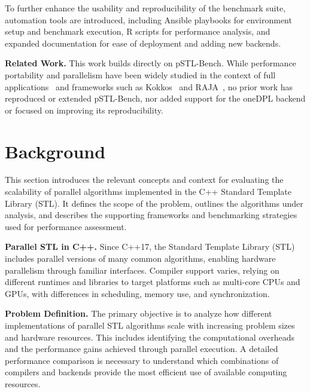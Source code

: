 \documentclass[sigconf]{acmart}
\newcommand{\mypar}[1]{{\bf #1.}}
\begin{document}
To further enhance the usability and reproducibility of the benchmark suite,
automation tools are introduced, including Ansible playbooks for environment
setup and benchmark execution, R scripts for performance analysis, and expanded
documentation for ease of deployment and adding new backends.

\mypar{Related Work} This work builds directly on pSTL-Bench.
While performance portability and parallelism have been widely studied in
the context of full applications~\cite{app} and frameworks such as Kokkos~\cite{Kokkos}
and RAJA~\cite{RAJA}, no prior work has reproduced or extended pSTL-Bench,
nor added support for the oneDPL backend or focused on improving its reproducibility.

\section{Background}\label{sec:background}
This section introduces the relevant concepts and context for evaluating the
scalability of parallel algorithms implemented in the C++ Standard Template
Library (STL). It defines the scope of the problem, outlines the algorithms
under analysis, and describes the supporting frameworks and benchmarking
strategies used for performance assessment.

\mypar{Parallel STL in C++} Since C++17, the Standard Template Library (STL) includes parallel versions
of many common algorithms, enabling hardware parallelism through
familiar interfaces. Compiler support varies, relying on different
runtimes and libraries to target platforms such as multi-core CPUs
and GPUs, with differences in scheduling, memory use, and synchronization.

\mypar{Problem Definition} The primary objective is to analyze how different implementations
of parallel STL algorithms scale with increasing problem sizes and hardware resources.
This includes identifying the computational overheads and the performance gains achieved
through parallel execution. A detailed performance comparison is necessary to understand
which combinations of compilers and backends provide the most efficient use of available
computing resources.
\end{document}
